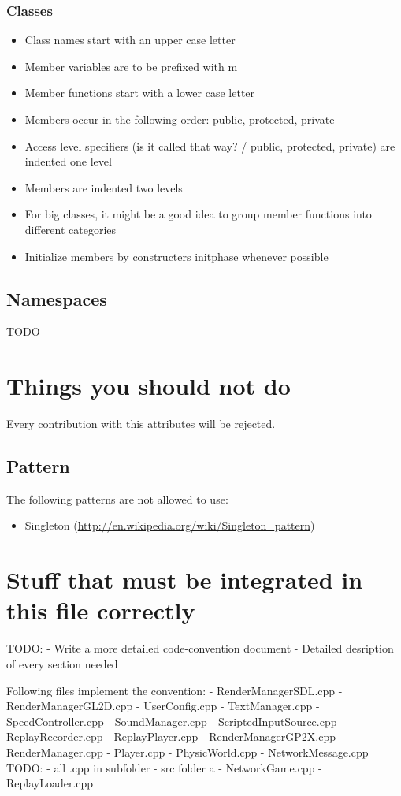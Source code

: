 \documentclass[a4paper]{scrartcl}
\begin{document}
\subsubsection{Classes}
\begin{itemize}
	\item Class names start with an upper case letter
	\item Member variables are to be prefixed with m
	\item Member functions start with a lower case letter
	\item Members occur in the following order: public, protected, private
	\item Access level specifiers (is it called that way? / public, protected, private) are indented one level
	\item Members are indented two levels
	\item For big classes, it might be a good idea to group member functions into different categories
	\item Initialize members by constructers initphase whenever possible
\end{itemize}



\subsection{Namespaces}
TODO


\section{Things you should not do}
Every contribution with this attributes will be rejected.



\subsection{Pattern}
The following patterns are not allowed to use:
\begin{itemize}
	\item Singleton (\url{http://en.wikipedia.org/wiki/Singleton_pattern})
\end{itemize}
 


\section{Stuff that must be integrated in this file correctly}
TODO:
- Write a more detailed code-convention document
- Detailed desription of every section needed

Following files implement the convention:
- RenderManagerSDL.cpp
- RenderManagerGL2D.cpp
- UserConfig.cpp
- TextManager.cpp
- SpeedController.cpp
- SoundManager.cpp
- ScriptedInputSource.cpp
- ReplayRecorder.cpp
- ReplayPlayer.cpp
- RenderManagerGP2X.cpp
- RenderManager.cpp
- Player.cpp
- PhysicWorld.cpp
- NetworkMessage.cpp
TODO:
- all .cpp in subfolder
- src folder a - NetworkGame.cpp
- ReplayLoader.cpp
\end{document}
